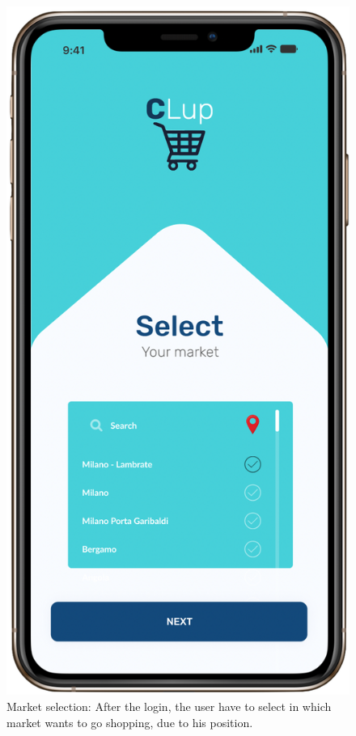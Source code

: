 \begin{figure}[H]
  \caption{Market selection: After the login, the user have to select in which market wants to go shopping, due to his position.}
  \label{fig:Login}
  \centering
 \includegraphics[scale=0.31]{images/mockup/select2.png}

\end{figure}







